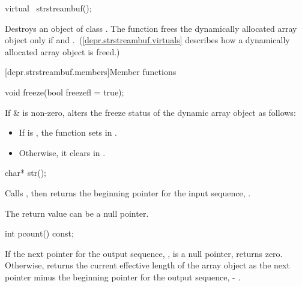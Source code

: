 %
\begin{itemdecl}
virtual ~strstreambuf();
\end{itemdecl}

\begin{itemdescr}
\pnum
\effects
Destroys an object of class
.
The function frees the dynamically allocated array object only if
and
.~(\ref{depr.strstreambuf.virtuals} describes how a dynamically allocated array object is freed.)
\end{itemdescr}

[depr.strstreambuf.members]{Member functions}

%
\begin{itemdecl}
void freeze(bool freezefl = true);
\end{itemdecl}

\begin{itemdescr}
\pnum
\effects
If  \&  is non-zero, alters the
freeze status of the dynamic array object as follows:
\begin{itemize}
\item
If  is
,
the function sets  in .
\item
Otherwise, it clears  in .
\end{itemize}
\end{itemdescr}

%
\begin{itemdecl}
char* str();
\end{itemdecl}

\begin{itemdescr}
\pnum
\effects
Calls
,
then returns the beginning pointer for the input sequence, .

\pnum
\notes
The return value can be a null pointer.
\end{itemdescr}

%
\begin{itemdecl}
int pcount() const;
\end{itemdecl}

\begin{itemdescr}
\pnum
\effects
If the next pointer for the output sequence, , is
a null pointer, returns zero.
Otherwise, returns the current
effective length of the array object as the next pointer minus the beginning
pointer for the output sequence,  - .
\end{itemdescr}

